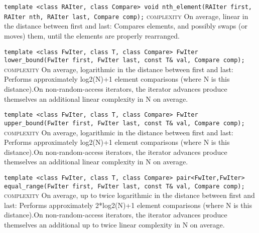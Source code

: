 \noindent{}\hspace*{0.25em}\lstinline[basicstyle=\ttfamily\color{corange}]{template <class RAIter, class Compare> void nth_element(RAIter first, RAIter nth, RAIter last, Compare comp);} \textsc{complexity} On average, linear in the distance between first and last: Compares elements, and possibly swaps (or moves) them, until the elements are properly rearranged.\\\vspace{-0.6em}

\noindent{}\hspace*{0.25em}\lstinline[basicstyle=\ttfamily\color{corange}]{template <class FwIter, class T, class Compare> FwIter lower_bound(FwIter first, FwIter last, const T& val, Compare comp);} \textsc{complexity} On average, logarithmic in the distance between first and last: Performs approximately log2(N)+1 element comparisons (where N is this distance).On non-random-access iterators, the iterator advances produce themselves an additional linear complexity in N on average.\\\vspace{-0.6em}

\noindent{}\hspace*{0.25em}\lstinline[basicstyle=\ttfamily\color{corange}]{template <class FwIter, class T, class Compare> FwIter upper_bound(FwIter first, FwIter last, const T& val, Compare comp);} \textsc{complexity} On average, logarithmic in the distance between first and last: Performs approximately log2(N)+1 element comparisons (where N is this distance).On non-random-access iterators, the iterator advances produce themselves an additional linear complexity in N on average.\\\vspace{-0.6em}

\noindent{}\hspace*{0.25em}\lstinline[basicstyle=\ttfamily\color{corange}]{template <class FwIter, class T, class Compare> pair<FwIter,FwIter> equal_range(FwIter first, FwIter last, const T& val, Compare comp);} \textsc{complexity} On average, up to twice logarithmic in the distance between first and last: Performs approximately 2*log2(N)+1 element comparisons (where N is this distance).On non-random-access iterators, the iterator advances produce themselves an additional up to twice linear complexity in N on average.\\\vspace{-0.6em}

